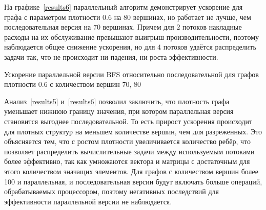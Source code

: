 На графике~\ref{results6} параллельный алгоритм демонстрирует ускорение для графа с параметром плотности $0.6$ на $80$ вершинах, но работает не лучше, чем последовательная версия на $70$ вершинах. Причем для $2$ потоков накладные расходы на их обслуживание превышают выигрыш производительности, поэтому наблюдается общее снижение ускорения, но для $4$ потоков удаётся распределить задачи так, что не происходит ни падения, ни роста эффективности.

\begin{table}
  \centering

\caption{Ускорение параллельной версии BFS относительно последовательной для графов плотности 0.6 с количеством вершин 70, 80}
\label{results6}
\end{table}

Анализ~\ref{results5} и~\ref{results6} позволил заключить, что плотность графа уменьшает нижнюю границу значения, при котором параллельная версия становится выгоднее последовательной. То есть прирост ускорения происходит для плотных структур на меньшем количестве вершин, чем для разреженных.
Это объясняется тем, что с ростом плотности увеличивается количество ребёр, что позволяет распределить вычислительные задачи между используемым потоками более эффективно, так как умножаются вектора и матрицы с достаточным для этого количеством значащих элементов. Для графов с количеством вершин более 100 и параллельная, и последовательная версии будут включать больше операций, обрабатываемых процессором, поэтому негативных последствий для эффективности параллельной версии не наблюдается.
